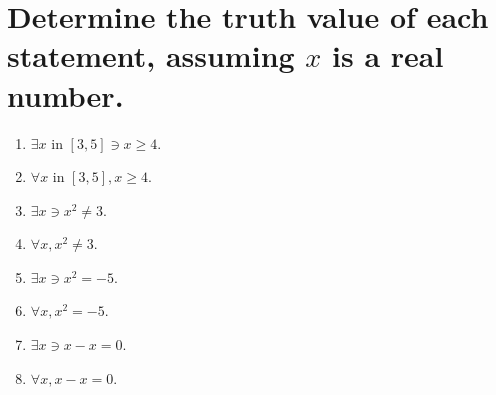 \documentclass[11pt]{article} %
\begin{document}
\section{Determine the truth value of each statement, assuming $x$ is a real number.}
\begin{enumerate}
\item $\exists x$ in $\left[ 3,5 \right]\ni x\geq4$.
\item $\forall x$ in $\left[ 3,5 \right], x\geq4$.
\item $\exists x \ni x^2 \neq 3$.
\item $\forall x, x^2 \neq 3$.
\item $\exists x \ni x^2 = -5$.
\item $\forall x, x^2 = -5$.
\item $\exists x \ni x-x=0$.
\item $\forall x, x-x=0$.
\end{enumerate}
\end{document}
